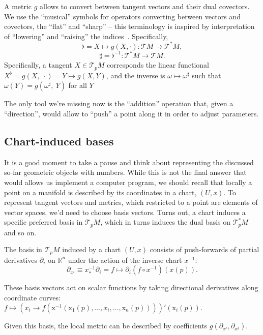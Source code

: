 A metric \( g \) allows to convert between tangent vectors and their dual
covectors.
We use the ``musical'' symbols for operators
converting between vectors and covectors, the ``flat'' and ``sharp'' -- this
terminology is inspired by interpretation of ``lowering'' and ``raising''
the indices~\cite{leeRiem}. Specifically,
\[ \flat = X \mapsto g(X, \cdot): \mathcal{T}M\to \mathcal{T}^*M, \]
\[ \sharp = \flat^{-1} : \mathcal{T}^*M \to \mathcal{T}M. \]
Specifically, a tangent \( X\in\mathcal{T}_p M\) corresponds the linear
functional \( X^\flat = g(X,~\cdot) = Y \mapsto g(X, Y) \), and the inverse is \(
\omega\mapsto \omega^{\sharp} \) such that \( \omega(Y) =
g\left(\omega^{\sharp},~Y\right) \) for all \( Y \)

The only tool we're missing now is the ``addition'' operation that, given a
``direction'', would allow to ``push'' a point along it in order to adjust
parameters. 

\subsection*{Chart-induced bases}

It is a good moment to take a pause and think about representing the discussed
so-far geometric objects with numbers. While this is not the final answer that
would allows us implement a computer program, we should recall that locally a
point on a manifold is described by its coordinates in a chart, \( (U, x) \).
To represent tangent vectors and metrics, which restricted to a point are
elements of vector spaces, we'd need to choose basis vectors. Turns out,
a chart induces a specific preferred basis in \( \mathcal{T}_pM \),
which in turns induces the dual basis on \( \mathcal{T}^*_pM \) and so on.

The basis in \( \mathcal{T}_pM \) induced by a chart \( (U, x) \) consists of
push-forwards of partial derivatives \( \partial_i \) on \(\mathbb{R}^n\) under
the action of the inverse chart \( x^{-1} \):
\[ \partial_{x^i} \equiv x^{-1}_*\partial_i = f\mapsto \partial_i (f \circ x^{-1})(x(p)). \]

These basis vectors act on scalar functions by taking directional derivatives
along coordinate curves: \( f \mapsto \left(x_i \to
f\left(\mathrm{x}^{-1}\left(\mathrm{x}_1(p), \ldots, x_i, \ldots,
\mathrm{x}_n(p)\right)\right)\right)'(\mathrm{x}_i(p)). \)

Given this basis, the local metric can be described by coefficients
\( g(\partial_{x^i}, \partial_{x^j}) \).


